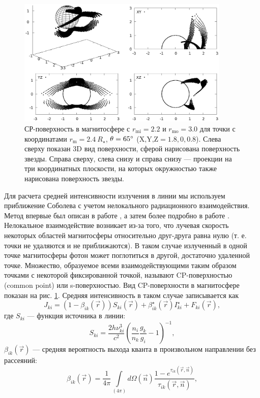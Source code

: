 \documentclass[12pt]{article}
\begin{document}
\begin{figure}[h]
\centering
\includegraphics[width=0.9\textwidth]{surf.eps}
\caption{СР-поверхность в магнитосфере с $r_\text{mi} = 2.2$ и $r_\text{mo} = 3.0$ для точки с координатами $r_\text{m} = 2.4\ R_\star$, $\theta = 65\degree$ ($\text{X,Y,Z} = 1.8,0,0.8$). Слева сверху показан 3D вид поверхности, сферой нарисована поверхность звезды. Справа сверху, слева снизу и справа снизу --- проекции на три координатных плоскости, на которых окружностью также нарисована поверхность звезды.}
\label{fig:CPsurf}
\end{figure}

Для расчета средней интенсивности излучения в линии мы используем приближение Соболева с учетом нелокального радиационного взаимодействия. Метод впервые был описан в работе \cite{grachev75}, а затем более подробно в работе \cite{rybicki78}. Нелокальное взаимодействие возникает из-за того, что лучевая скорость некоторых областей магнитосферы относительно друг-друга равна нулю (т. е. точки не удаляются и не приближаются). В таком случае излученный в одной точке магнитосферы фотон может поглотиться в другой, достаточно удаленной точке. Множество, образуемое всеми взаимодействующими таким образом точками с некоторой фиксированной точкой, называют CP-поверхностью (common point) или s-поверхностью. Вид CP-поверхности в магнитосфере показан на рис. \ref{fig:CPsurf}. Средняя интенсивность в таком случае записывается как
\FloatBarrier
\begin{equation} \label{eq:meanint}
J_{ki} = (1-\beta_{ik}(\vec{r}))S_{ki}(\vec{r}) + \beta_{ik}^\star(\vec{r})I^\star_{ki} + F_{ki}(\vec{r}),
\end{equation}
где $S_{ki}$ --- функция источника в линии:
\begin{equation} \label{eq:source}
S_{ki} = \frac{2h\nu_{ki}^3}{c^2}\left( \frac{n_i}{n_k} \frac{g_k}{g_i} - 1 \right)^{-1},
\end{equation}
$\beta_{ik}(\vec{r})$ --- средняя вероятность выхода кванта в произвольном направлении без рассеяний:
\begin{equation} \label{eq:beta}
\beta_{ik}(\vec{r}) = \frac{1}{4\pi}\int\limits_{(4\pi)} d\Omega(\vec{n})\frac{1-e^{\tau_{ik}(\vec{r},\vec{n})}}{\tau_{ik}(\vec{r},\vec{n})}, 
\end{equation}
\end{document}
